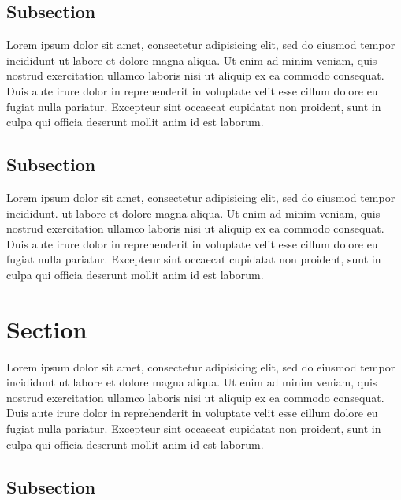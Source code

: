 \documentclass[a5paper, 10pt]{book}
\begin{document}
	\subsection{Subsection}

	Lorem ipsum dolor sit amet, consectetur adipisicing elit, sed do eiusmod tempor incididunt ut labore et dolore magna aliqua. Ut enim ad minim veniam, quis nostrud exercitation ullamco laboris nisi ut aliquip ex ea commodo consequat. Duis aute irure dolor in reprehenderit in voluptate velit esse cillum dolore eu fugiat nulla pariatur. Excepteur sint occaecat cupidatat non proident, sunt in culpa qui officia deserunt mollit anim id est laborum.

	\subsection{Subsection}

	Lorem ipsum dolor sit amet, consectetur adipisicing elit, sed do eiusmod tempor incididunt. ut labore et dolore magna aliqua. Ut enim ad minim veniam, quis nostrud exercitation ullamco laboris nisi ut aliquip ex ea commodo consequat. Duis aute irure dolor in reprehenderit in voluptate velit esse cillum dolore eu fugiat nulla pariatur. Excepteur sint occaecat cupidatat non proident, sunt in culpa qui officia deserunt mollit anim id est laborum.

	\section{Section}

	Lorem ipsum dolor sit amet, consectetur adipisicing elit, sed do eiusmod tempor incididunt ut labore et dolore magna aliqua. Ut enim ad minim veniam, quis nostrud exercitation ullamco laboris nisi ut aliquip ex ea commodo consequat. Duis aute irure dolor in reprehenderit in voluptate velit esse cillum dolore eu fugiat nulla pariatur. Excepteur sint occaecat cupidatat non proident, sunt in culpa qui officia deserunt mollit anim id est laborum.

	\subsection{Subsection}
\end{document}
